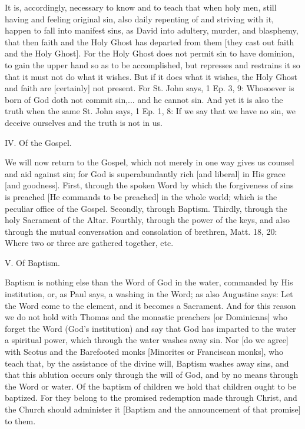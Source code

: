 It is, accordingly, necessary to know and to teach that when
holy men, still having and feeling original sin, also daily
repenting of and striving with it, happen to fall into
manifest sins, as David into adultery, murder, and blasphemy,
that then faith and the Holy Ghost has departed from them
[they cast out faith and the Holy Ghost]. For the Holy Ghost
does not permit sin to have dominion, to gain the upper hand
so as to be accomplished, but represses and restrains it so
that it must not do what it wishes. But if it does what it
wishes, the Holy Ghost and faith are [certainly] not present.
For St. John says, 1 Ep. 3, 9: Whosoever is born of God doth
not commit sin,... and he cannot sin. And yet it is also the
truth when the same St. John says, 1 Ep. 1, 8: If we say that
we have no sin, we deceive ourselves and the truth is not in
us.


IV. Of the Gospel.

We will now return to the Gospel, which not merely in one way
gives us counsel and aid against sin; for God is
superabundantly rich [and liberal] in His grace [and
goodness]. First, through the spoken Word by which the
forgiveness of sins is preached [He commands to be preached]
in the whole world; which is the peculiar office of the
Gospel. Secondly, through Baptism. Thirdly, through the holy
Sacrament of the Altar. Fourthly, through the power of the
keys, and also through the mutual conversation and consolation
of brethren, Matt. 18, 20: Where two or three are gathered
together, etc.


V. Of Baptism.

Baptism is nothing else than the Word of God in the water,
commanded by His institution, or, as Paul says, a washing in
the Word; as also Augustine says: Let the Word come to the
element, and it becomes a Sacrament. And for this reason we do
not hold with Thomas and the monastic preachers [or
Dominicans] who forget the Word (God's institution) and say
that God has imparted to the water a spiritual power, which
through the water washes away sin. Nor [do we agree] with
Scotus and the Barefooted monks [Minorites or Franciscan
monks], who teach that, by the assistance of the divine will,
Baptism washes away sins, and that this ablution occurs only
through the will of God, and by no means through the Word or
water. Of the baptism of children we hold that children ought
to be baptized. For they belong to the promised redemption
made through Christ, and the Church should administer it
[Baptism and the announcement of that promise] to them.


